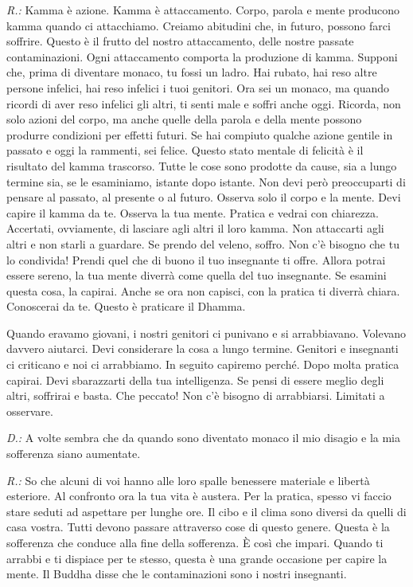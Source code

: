 \emph{R.:} Kamma è azione. Kamma è attaccamento. Corpo, parola e
mente producono kamma quando ci attacchiamo. Creiamo abitudini
che, in futuro, possono farci soffrire. Questo è il frutto del nostro
attaccamento, delle nostre passate contaminazioni. Ogni attaccamento
comporta la produzione di kamma. Supponi che, prima di diventare
monaco, tu fossi un ladro. Hai rubato, hai reso altre persone infelici,
hai reso infelici i tuoi genitori. Ora sei un monaco, ma quando ricordi
di aver reso infelici gli altri, ti senti male e soffri anche oggi.
Ricorda, non solo azioni del corpo, ma anche quelle della parola e della
mente possono produrre condizioni per effetti futuri. Se hai compiuto
qualche azione gentile in passato e oggi la rammenti, sei felice. Questo
stato mentale di felicità è il risultato del kamma trascorso.
Tutte le cose sono prodotte da cause, sia a lungo termine sia, se le
esaminiamo, istante dopo istante. Non devi però preoccuparti di pensare
al passato, al presente o al futuro. Osserva solo il corpo e la mente.
Devi capire il kamma da te. Osserva la tua mente. Pratica e
vedrai con chiarezza. Accertati, ovviamente, di lasciare agli altri il
loro kamma. Non attaccarti agli altri e non starli a guardare. Se
prendo del veleno, soffro. Non c'è bisogno che tu lo condivida! Prendi
quel che di buono il tuo insegnante ti offre. Allora potrai essere
sereno, la tua mente diverrà come quella del tuo insegnante. Se esamini
questa cosa, la capirai. Anche se ora non capisci, con la pratica ti
diverrà chiara. Conoscerai da te. Questo è praticare il Dhamma.

Quando eravamo giovani, i nostri genitori ci punivano e si arrabbiavano.
Volevano davvero aiutarci. Devi considerare la cosa a lungo termine.
Genitori e insegnanti ci criticano e noi ci arrabbiamo. In seguito
capiremo perché. Dopo molta pratica capirai. Devi sbarazzarti della tua
intelligenza. Se pensi di essere meglio degli altri, soffrirai e basta.
Che peccato! Non c'è bisogno di arrabbiarsi. Limitati a osservare.

\emph{D.:} A volte sembra che da quando sono diventato monaco il mio disagio e
la mia sofferenza siano aumentate.

\emph{R.:} So che alcuni di voi hanno alle loro spalle benessere materiale e
libertà esteriore. Al confronto ora la tua vita è austera. Per la
pratica, spesso vi faccio stare seduti ad aspettare per lunghe ore. Il
cibo e il clima sono diversi da quelli di casa vostra. Tutti devono
passare attraverso cose di questo genere. Questa è la sofferenza che
conduce alla fine della sofferenza. È così che impari. Quando ti arrabbi
e ti dispiace per te stesso, questa è una grande occasione per capire la
mente. Il Buddha disse che le contaminazioni sono i nostri insegnanti.

